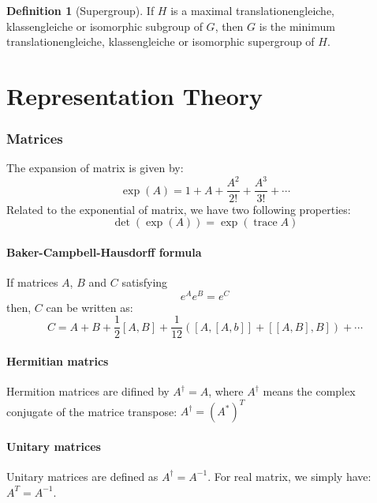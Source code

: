 \documentclass{amsart}
\theoremstyle{remark}
\theoremstyle{remark}
\theoremstyle{definition}
\newtheorem*{definition}{Definition}
\DeclareMathOperator{\Tr}{trace}
\begin{document}
\vspace{10pt}

\begin{definition}
    [Supergroup]
    If $H$ is a maximal translationengleiche, klassengleiche or isomorphic subgroup of $G$, then $G$
    is the minimum translationengleiche, klassengleiche or isomorphic supergroup of $H$.
\end{definition}


\newpage
\part{Representation Theory}

\section*{Matrices}
The expansion of matrix is given by:
\begin{equation*}
    \exp(A) = 1+ A + \frac{A^2}{2!} + \frac{A^3}{3!} + \cdots 
\end{equation*}
Related to the exponential of matrix, we have two following properties:
\begin{equation*}
    \det(\exp(A)) = \exp(\Tr A)
\end{equation*}

\subsection*{Baker-Campbell-Hausdorff formula}
If matrices $A$, $B$ and $C$ satisfying
\begin{equation*}
    e^{A} e^{B} = e^{C}
\end{equation*}
then, $C$ can be written as:
\begin{equation*}
    C = A + B + \frac{1}{2}[A,B] + \frac{1}{12}\left( [A,[A,b]] + [[A,B],B] \right) + \cdots
\end{equation*}

\vspace{10pt}

\subsection*{Hermitian matrics}
Hermition matrices are difined by $A^{\dagger} = A$, where $A^{\dagger}$ means
the complex conjugate of the matrice transpose: $A^{\dagger} = (A^*)^{T}$

\subsection*{Unitary matrices}
Unitary matrices are defined as $A^{\dagger} = A^{-1}$. 
For real matrix, we simply have: $A^T = A^{-1}$.
\end{document}
